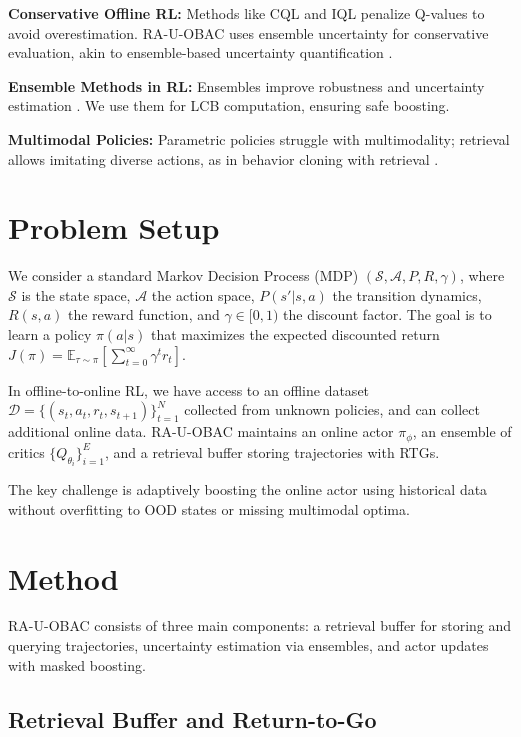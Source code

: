 \documentclass{article}
\begin{document}
\textbf{Conservative Offline RL:} Methods like CQL \cite{cql2020} and IQL \cite{iql2020} penalize Q-values to avoid overestimation. RA-U-OBAC uses ensemble uncertainty for conservative evaluation, akin to ensemble-based uncertainty quantification \cite{lakshminarayanan2017}.

\textbf{Ensemble Methods in RL:} Ensembles improve robustness and uncertainty estimation \cite{hoffman2023rliable}. We use them for LCB computation, ensuring safe boosting.

\textbf{Multimodal Policies:} Parametric policies struggle with multimodality; retrieval allows imitating diverse actions, as in behavior cloning with retrieval \cite{ye2021mastering}.

\section{Problem Setup}
\label{sec:setup}

We consider a standard Markov Decision Process (MDP) $(\mathcal{S}, \mathcal{A}, P, R, \gamma)$, where $\mathcal{S}$ is the state space, $\mathcal{A}$ the action space, $P(s'|s,a)$ the transition dynamics, $R(s,a)$ the reward function, and $\gamma \in [0,1)$ the discount factor. The goal is to learn a policy $\pi(a|s)$ that maximizes the expected discounted return $J(\pi) = \mathbb{E}_{\tau \sim \pi} [\sum_{t=0}^\infty \gamma^t r_t]$.

In offline-to-online RL, we have access to an offline dataset $\mathcal{D} = \{ (s_t, a_t, r_t, s_{t+1}) \}_{t=1}^N$ collected from unknown policies, and can collect additional online data. RA-U-OBAC maintains an online actor $\pi_\phi$, an ensemble of critics $\{Q_{\theta_i}\}_{i=1}^E$, and a retrieval buffer storing trajectories with RTGs.

The key challenge is adaptively boosting the online actor using historical data without overfitting to OOD states or missing multimodal optima.

\section{Method}
\label{sec:method}

RA-U-OBAC consists of three main components: a retrieval buffer for storing and querying trajectories, uncertainty estimation via ensembles, and actor updates with masked boosting.

\subsection{Retrieval Buffer and Return-to-Go}
\end{document}
